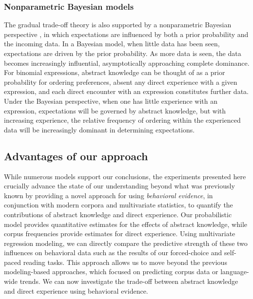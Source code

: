 \documentclass[authoryear]{elsarticle}
\begin{document}
\subsubsection{Nonparametric Bayesian models}
The gradual trade-off theory is also supported by a nonparametric Bayesian perspective \citep[e.g.][]{Goldwater:2009jy,Xu:2007dt}, in which expectations are influenced by both a prior probability and the incoming data. In a Bayesian model, when little data has been seen, expectations are driven by the prior probability. As more data is seen, the data becomes increasingly influential, asymptotically approaching complete dominance. For binomial expressions, abstract knowledge can be thought of as a prior probability for ordering preferences, absent any direct experience with a given expression, and each direct encounter with an expression constitutes further data. Under the Bayesian perspective, when one has little experience with an expression, expectations will be governed by abstract knowledge, but with increasing experience, the relative frequency of ordering within the experienced data will be increasingly dominant in determining expectations.

\subsection{Advantages of our approach}
While numerous models support our conclusions, the experiments presented here crucially advance the state of our understanding beyond what was previously known by providing a novel approach for using \emph{behavioral evidence}, in conjunction with modern corpora and multivariate statistics, to quantify the contributions of abstract knowledge and direct experience. Our probabilistic model provides quantitative estimates for the effects of abstract knowledge, while corpus frequencies provide estimates for direct experience. Using multivariate regression modeling, we can directly compare the predictive strength of these two influences on behavioral data such as the results of our forced-choice and self-paced reading tasks. This approach allows us to move beyond the previous modeling-based approaches, which focused on predicting corpus data or language-wide trends. We can now investigate the trade-off between abstract knowledge and direct experience using behavioral evidence.
\end{document}
